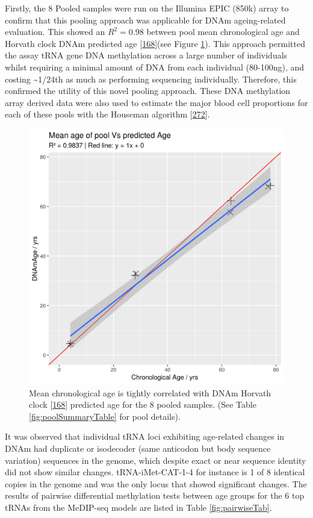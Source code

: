 \documentclass[
]{book}
\begin{document}
Firstly, the 8 Pooled samples were run on the Illumina EPIC (850k) array to confirm that this pooling approach was applicable for DNAm ageing-related evaluation.
This showed an \(R^2 = 0.98\) between pool mean chronological age and Horvath clock DNAm predicted age {[}\protect\hyperlink{ref-Horvath2013}{168}{]}(see Figure \ref{fig:DNAmAgeVsChronAge}).
This approach permitted the assay tRNA gene DNA methylation across a large number of individuals whilst requiring a minimal amount of DNA from each individual (80-100ng), and costing \textasciitilde1/24th as much as performing sequencing individually.
Therefore, this confirmed the utility of this novel pooling approach.
These DNA methylation array derived data were also used to estimate the major blood cell proportions for each of these pools with the Houseman algorithm {[}\protect\hyperlink{ref-Houseman2012}{272}{]}.

\begin{figure}

{\centering \includegraphics[width=0.6\linewidth]{./figs/DNAmAgeVsChronAge} 

}

\caption{Mean chronological age is tightly correlated with DNAm Horvath clock {[}\protect\hyperlink{ref-Horvath2013}{168}{]} predicted age for the 8 pooled samples. (See Table \ref{fig:poolSummaryTable} for pool details).}\label{fig:DNAmAgeVsChronAge}
\end{figure}



It was observed that individual tRNA loci exhibiting age-related changes in DNAm had duplicate or isodecoder (same anticodon but body sequence variation) sequences in the genome, which despite exact or near sequence identity did not show similar changes.
tRNA-iMet-CAT-1-4 for instance is 1 of 8 identical copies in the genome and was the only locus that showed significant changes.
The results of pairwise differential methylation tests between age groups for the 6 top tRNAs from the MeDIP-seq models are listed in Table \ref{fig:pairwiseTab}.
\end{document}
